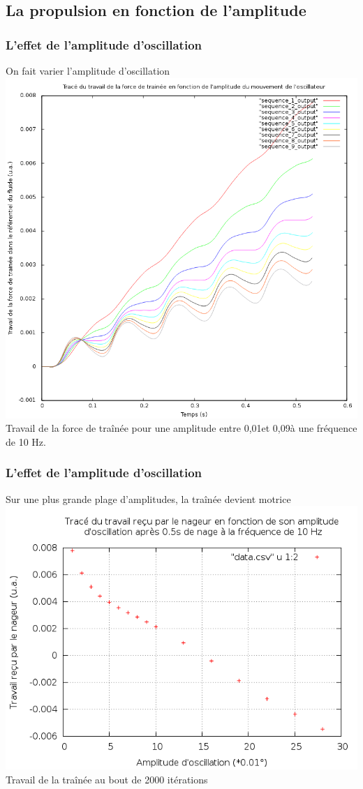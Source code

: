 \documentclass{beamer}
\begin{document}
 \subsection{La propulsion en fonction de l'amplitude}
 		
 	\begin{frame}
 		\frametitle{L'effet de l'amplitude d'oscillation}
 			On fait varier l'amplitude d'oscillation
			\centering \includegraphics[height= 0.6 \textheight]{9courbes.png}\\
 			Travail de la force de traînée pour une amplitude entre 0,01\degre et 0,09\degre à une fréquence de 10 Hz.
 	\end{frame}
 	
 	\begin{frame}
 		\frametitle{L'effet de l'amplitude d'oscillation}
 		Sur une plus grande plage d'amplitudes, la traînée devient motrice
 		\centering \includegraphics[width= 0.8 \linewidth]{bcp_points.png}\\
 		Travail de la traînée au bout de 2000 itérations
 	\end{frame}
  
\end{document}
